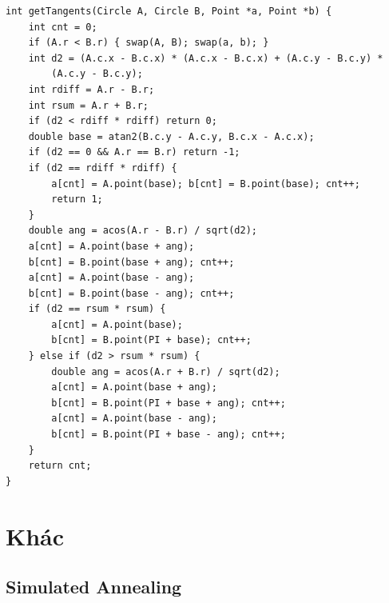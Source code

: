 \documentclass[11pt]{article}
\begin{document}
\begin{verbatim}
int getTangents(Circle A, Circle B, Point *a, Point *b) {
    int cnt = 0;
    if (A.r < B.r) { swap(A, B); swap(a, b); }
    int d2 = (A.c.x - B.c.x) * (A.c.x - B.c.x) + (A.c.y - B.c.y) *
        (A.c.y - B.c.y);
    int rdiff = A.r - B.r;
    int rsum = A.r + B.r;
    if (d2 < rdiff * rdiff) return 0;
    double base = atan2(B.c.y - A.c.y, B.c.x - A.c.x);
    if (d2 == 0 && A.r == B.r) return -1;
    if (d2 == rdiff * rdiff) {
        a[cnt] = A.point(base); b[cnt] = B.point(base); cnt++;
        return 1;
    }
    double ang = acos(A.r - B.r) / sqrt(d2);
    a[cnt] = A.point(base + ang);
    b[cnt] = B.point(base + ang); cnt++;
    a[cnt] = A.point(base - ang);
    b[cnt] = B.point(base - ang); cnt++;
    if (d2 == rsum * rsum) {
        a[cnt] = A.point(base);
        b[cnt] = B.point(PI + base); cnt++;
    } else if (d2 > rsum * rsum) {
        double ang = acos(A.r + B.r) / sqrt(d2);
        a[cnt] = A.point(base + ang);
        b[cnt] = B.point(PI + base + ang); cnt++;
        a[cnt] = A.point(base - ang);
        b[cnt] = B.point(PI + base - ang); cnt++;
    }
    return cnt;
}
\end{verbatim}
\endgroup

\section{Khác}

\subsection{Simulated Annealing}
\end{document}
